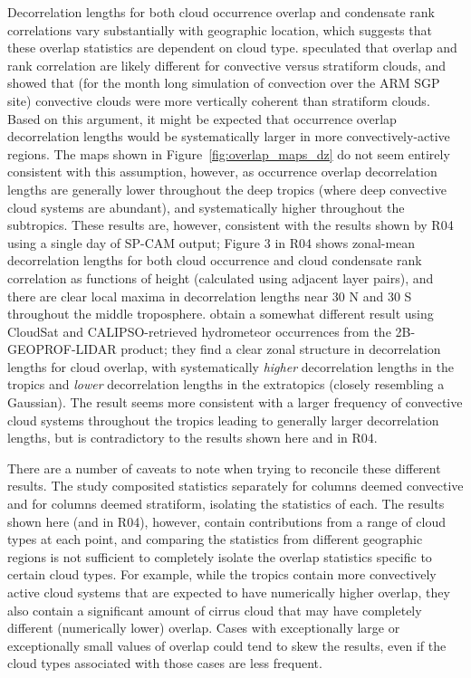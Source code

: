 Decorrelation lengths for both cloud occurrence overlap and condensate
rank correlations vary substantially with geographic location, which
suggests that these overlap statistics are dependent on cloud type.
\citet{pincus_et_al_2005} speculated that overlap and rank correlation
are likely different for convective versus stratiform clouds, and showed
that (for the month long simulation of convection over the ARM SGP site)
convective clouds were more vertically coherent than stratiform clouds.
Based on this argument, it might be expected that occurrence overlap
decorrelation lengths would be systematically larger in more
convectively-active regions. The maps shown in
Figure~\ref{fig:overlap_maps_dz} do not seem entirely consistent with
this assumption, however, as occurrence overlap decorrelation lengths
are generally lower throughout the deep tropics (where deep convective
cloud systems are abundant), and systematically higher throughout the
subtropics. These results are, however, consistent with the results
shown by R04 using a single day of SP-CAM output; Figure 3 in R04 shows
zonal-mean decorrelation lengths for both cloud occurrence and cloud
condensate rank correlation as functions of height (calculated using
adjacent layer pairs), and there are clear local maxima in decorrelation
lengths near 30 N and 30 S throughout the middle troposphere.
\citet{oreopoulos_et_al_2012} obtain a somewhat different result using
CloudSat and CALIPSO-retrieved hydrometeor occurrences from the
2B-GEOPROF-LIDAR product; they find a clear zonal structure in
decorrelation lengths for cloud overlap, with systematically
\emph{higher} decorrelation lengths in the tropics and \emph{lower}
decorrelation lengths in the extratopics (closely resembling a
Gaussian). The \citet{oreopoulos_et_al_2012} result seems more
consistent with a larger frequency of convective cloud systems
throughout the tropics leading to generally larger decorrelation
lengths, but is contradictory to the results shown here and in R04.

There are a number of caveats to note when trying to reconcile these
different results. The \citet{pincus_et_al_2005} study composited
statistics separately for columns deemed convective and for columns
deemed stratiform, isolating the statistics of each. The results shown
here (and in R04), however, contain contributions from a range of cloud
types at each point, and comparing the statistics from different
geographic regions is not sufficient to completely isolate the overlap
statistics specific to certain cloud types. For example, while the
tropics contain more convectively active cloud systems that are expected
to have numerically higher overlap, they also contain a significant
amount of cirrus cloud that may have completely different (numerically
lower) overlap. Cases with exceptionally large or exceptionally small
values of overlap could tend to skew the results, even if the cloud
types associated with those cases are less frequent.

